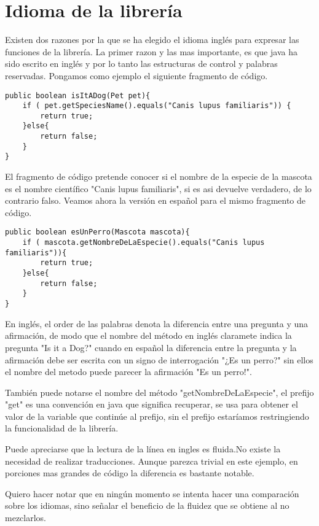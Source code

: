 	\section{Idioma de la librería}

		Existen dos razones por la que se ha elegido el idioma inglés para expresar las funciones de la librería. La primer razon y las mas importante, es que java ha sido escrito en inglés y por lo tanto las estructuras de control y palabras reservadas. Pongamos como ejemplo el siguiente fragmento de código.

\begin{lstlisting}
public boolean isItADog(Pet pet){
	if ( pet.getSpeciesName().equals("Canis lupus familiaris")) {
		return true;
	}else{
		return false;
	}
}
\end{lstlisting}

	El fragmento de código pretende conocer si el nombre de la especie de la mascota es el nombre científico "Canis lupus familiaris", si es asi devuelve verdadero, de lo contrario falso. Veamos ahora la versión en español para el mismo fragmento de código.

\begin{lstlisting}
public boolean esUnPerro(Mascota mascota){
	if ( mascota.getNombreDeLaEspecie().equals("Canis lupus familiaris")){
		return true;
	}else{
		return false;
	}
}
\end{lstlisting}

	En inglés, el order de las palabras denota la diferencia entre una pregunta y una afirmación, de modo que el nombre del método en inglés claramete indica la pregunta "Is it a Dog?" cuando en español la diferencia entre la pregunta y la afirmación debe ser escrita con un signo de interrogación "¿Es un perro?" sin ellos el nombre del metodo puede parecer la afirmación "Es un perro!".

	También puede notarse el nombre del método "getNombreDeLaEspecie", el prefijo "get" es una convención en java que significa recuperar, se usa para obtener el valor de la variable que continúe al prefijo, sin el prefijo estaríamos restringiendo la funcionalidad de la librería.

	Puede apreciarse que la lectura de la línea en ingles es fluida.No existe la necesidad de realizar traducciones. Aunque parezca trivial en este ejemplo, en porciones mas grandes de código la diferencia es bastante notable.

	Quiero hacer notar que en ningún momento se intenta hacer una comparación sobre los idiomas, sino señalar el beneficio de la fluidez que se obtiene al no mezclarlos.